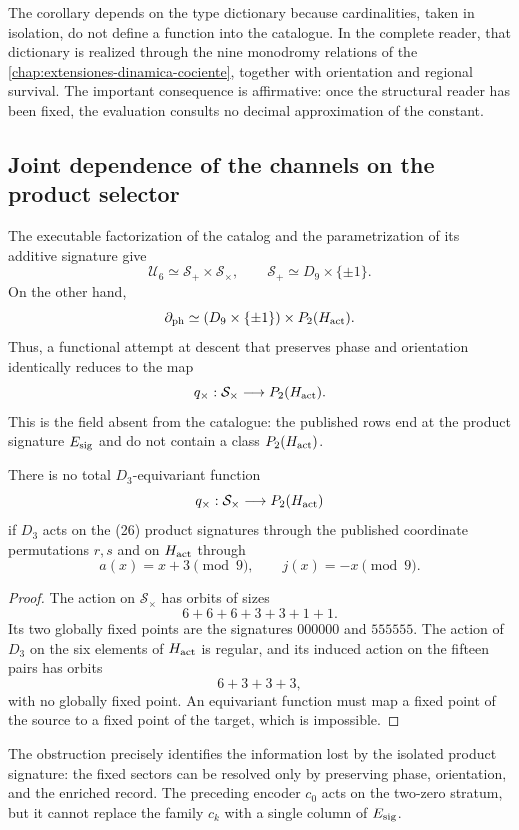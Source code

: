 The corollary depends on the type dictionary because cardinalities, taken in
isolation, do not define a function into the catalogue. In the complete reader,
that dictionary is realized through the nine monodromy relations of the
\cref{chap:extensiones-dinamica-cociente}, together with orientation and
regional survival. The important consequence is affirmative: once
the structural reader has been fixed, the evaluation consults no decimal
approximation of the constant.

\subsection{Joint dependence of the channels on the product selector}

The executable factorization of the catalog and the parametrization of its additive signature give
\[
 \mathcal U_6\simeq\mathcal S_+\times\mathcal S_\times,
 \qquad
 \mathcal S_+\simeq D_9\times\{\pm1\}.
\]
On the other hand,
\[
 \partial_{\rm ph}
 \simeq(D_9\times\{\pm1\})\times P_2(H_{\rm act}).
\]
Thus, a functional attempt at descent that preserves phase and orientation identically reduces to the map
\[
 q_\times:\mathcal S_\times\longrightarrow P_2(H_{\rm act}).
\]
This is the field absent from the catalogue: the published rows end at the
product signature \(E_{\rm sig}\) and do not contain a class
\(P_2(H_{\rm act})\).

\begin{proposition}
\label{prop:nogo-selector-producto-d3}
There is no total \(D_3\)-equivariant function
\[
 q_\times:\mathcal S_\times\longrightarrow P_2(H_{\rm act})
\]
if \(D_3\) acts on the (26) product signatures through the published coordinate
permutations \(r,s\) and on \(H_{\rm act}\) through
\[
 a(x)=x+3\pmod9,
 \qquad
 j(x)=-x\pmod9.
\]
\end{proposition}

\begin{proof}
The action on \(\mathcal S_\times\) has orbits of sizes
\[
 6+6+6+3+3+1+1.
\]
Its two globally fixed points are the signatures
\(000000\) and \(555555\). The action of \(D_3\) on the six elements of
\(H_{\rm act}\) is regular, and its induced action on the fifteen pairs has
orbits
\[
 6+3+3+3,
\]
with no globally fixed point. An equivariant function must map a fixed point
of the source to a fixed point of the target, which is impossible.
\end{proof}

The obstruction precisely identifies the information lost by the isolated
product signature: the fixed sectors can be resolved only by preserving phase,
orientation, and the enriched record. The preceding encoder \(c_0\) acts on
the two-zero stratum, but it cannot replace the family \(c_k\) with a
single column of \(E_{\rm sig}\).

